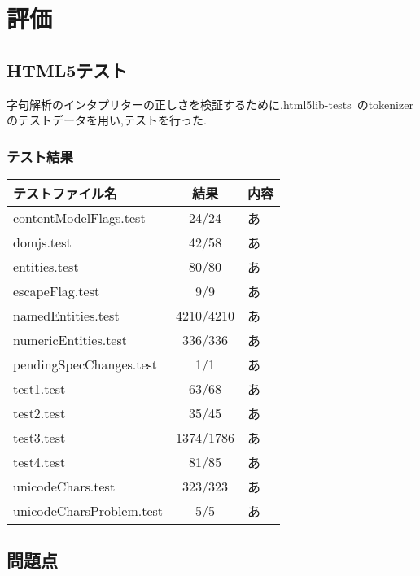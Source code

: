 \documentclass[uplatex,a4j]{jsreport}
\begin{document}
\chapter{評価}
\label{評価}
\section{HTML5テスト}
字句解析のインタプリターの正しさを検証するために,html5lib-tests~\cite{html5lib-tests}のtokenizerのテストデータを用い,テストを行った.
\subsection*{テスト結果}
\begin{table}[htb]
    \begin{tabular}{|l|c|l|} \hline
      テストファイル名 & 結果 & 内容\\ \hline 
      contentModelFlags.test & 24/24 & あ\\
      domjs.test & 42/58 & あ\\
      entities.test & 80/80 & あ\\
      escapeFlag.test & 9/9 & あ\\
      namedEntities.test & 4210/4210 & あ\\
      numericEntities.test & 336/336 & あ\\
      pendingSpecChanges.test & 1/1 & あ\\
      test1.test & 63/68 & あ\\
      test2.test & 35/45 & あ\\
      test3.test & 1374/1786 & あ\\
      test4.test & 81/85 & あ\\
      unicodeChars.test & 323/323 & あ\\
      unicodeCharsProblem.test & 5/5 & あ\\ \hline 
    \end{tabular}
\end{table}

\section{問題点}
\end{document}
